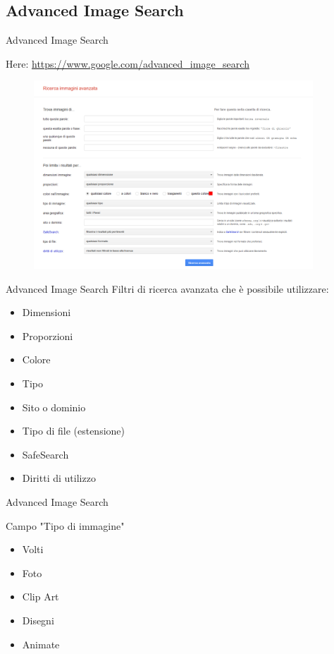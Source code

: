 \documentclass{beamer}
\begin{document}
\subsection{Advanced Image Search}
\begin{frame}{Advanced Image Search}
\begin{center}Here: 
\footnotesize
\textcolor{blue}{\href{https://www.google.it/advanced_image_search}{https://www.google.com/advanced\_image\_search}}
\begin{figure}[h!]
\includegraphics[height=200pt]{immagini/imageSearch.png}
\end{figure}
\end{center}
\end{frame}
\begin{frame}{Advanced Image Search}
Filtri di ricerca avanzata che è possibile utilizzare:
\begin{itemize}
\item    Dimensioni
\item    Proporzioni
\item    Colore
\item    Tipo
\item    Sito o dominio
\item    Tipo di file (estensione)
\item    SafeSearch
\item    Diritti di utilizzo
\end{itemize}
\end{frame}
\begin{frame}{Advanced Image Search}
\begin{block}{\begin{center}Campo "Tipo di immagine"\end{center}}
\begin{itemize}
\item Volti
\item Foto
\item Clip Art
\item Disegni
\item Animate
\end{itemize}
\end{block}
\end{frame}
\end{document}
